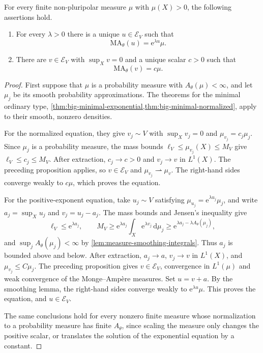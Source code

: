 \begin{theorem}\label{thm:big-minimal-general-measures}
For every finite non-pluripolar measure $\mu$ with $\mu(X)>0$, the following assertions hold.
\begin{enumerate}
\item For every $\lambda>0$ there is a unique $u\in\mathcal E_V$ such that
\[
 \mathrm{MA}_\theta(u)=\mathrm{e}^{\lambda u}\mu.
\]
\item There are $v\in\mathcal E_V$ with $\sup_Xv=0$ and a unique scalar $c>0$ such that
\[
 \mathrm{MA}_\theta(v)=c\mu.
\]
\end{enumerate}
\end{theorem}
\begin{proof}
First suppose that $\mu$ is a probability measure with $A_\theta(\mu)<\infty$, and let $\mu_j$ be its smooth probability approximations. The theorems for the minimal ordinary type, \cref{thm:big-minimal-exponential,thm:big-minimal-normalized}, apply to their smooth, nonzero densities.

For the normalized equation, they give $v_j\sim V$ with $\sup_Xv_j=0$ and $\mu_{v_j}=c_j\mu_j$. Since $\mu_j$ is a probability measure, the mass bounds $\ell_V\leq\mu_{v_j}(X)\leq M_V$ give $\ell_V\leq c_j\leq M_V$. After extraction, $c_j\to c>0$ and $v_j\to v$ in $L^1(X)$. The preceding proposition applies, so $v\in\mathcal E_V$ and $\mu_{v_j}\rightharpoonup\mu_v$. The right-hand sides converge weakly to $c\mu$, which proves the equation.

For the positive-exponent equation, take $u_j\sim V$ satisfying $\mu_{u_j}=\mathrm{e}^{\lambda u_j}\mu_j$, and write $a_j=\sup_Xu_j$ and $v_j=u_j-a_j$. The mass bounds and Jensen's inequality give
\[
 \ell_V\leq \mathrm{e}^{\lambda a_j},\qquad
 M_V\geq \mathrm{e}^{\lambda a_j}\int_X\mathrm{e}^{\lambda v_j}\,\mathrm{d}\mu_j
       \geq \mathrm{e}^{\lambda a_j-\lambda A_\theta(\mu_j)},
\]
and $\sup_jA_\theta(\mu_j)<\infty$ by \cref{lem:measure-smoothing-integrals}. Thus $a_j$ is bounded above and below. After extraction, $a_j\to a$, $v_j\to v$ in $L^1(X)$, and $\mu_{v_j}\leq C\mu_j$. The preceding proposition gives $v\in\mathcal E_V$, convergence in $L^1(\mu)$ and weak convergence of the Monge--Amp\`ere measures. Set $u=v+a$. By the smoothing lemma, the right-hand sides converge weakly to $\mathrm{e}^{\lambda u}\mu$. This proves the equation, and $u\in\mathcal E_V$.

The same conclusions hold for every nonzero finite measure whose normalization to a probability measure has finite $A_\theta$, since scaling the measure only changes the positive scalar, or translates the solution of the exponential equation by a constant.


\end{proof}
